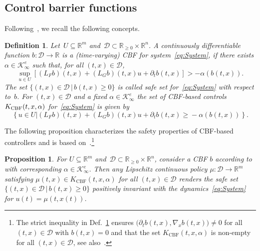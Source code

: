\documentclass[journal,twoside,web]{ieeeconf}
\newcommand{\R}{\mathbb{R}}
\newtheorem{prop}{Proposition}
\newtheorem{defn}{Definition}
\begin{document}
\subsection{Control barrier functions}

Following~\cite[Def.~2]{ames2019control}, we recall the following concepts.
\begin{defn} \label{Def:TVCBF}
   Let~$U \subseteq \R^m$ and~$\mathcal{D} \subset \R_{\ge 0} \times \R^n$.
     A continuously differentiable function $b: \mathcal{D} \to \R$ is a \textit{(time-varying) CBF} for system~\eqref{eq:System}, if there exists 
     $\alpha \in \mathcal{K}_\infty^e$ such that, for all $(t,x) \in \mathcal{D}$,
    \begin{equation*}
        \sup_{u \in U} \left[ (L_F b)(t,x) \!+\! (L_G b)(t,x) u \!+\! \partial_t b(t,x) \right] > - \alpha(b(t,x)).
    \end{equation*}
    The set 
    $   \{ (t,x)\in\mathcal{D} \, | \, b(t,x) \ge 0\} $
    is called \textit{safe set} for~\eqref{eq:System} with respect to~$b$.
    For $(t,x) \in \mathcal{D}$ and a fixed $\alpha \in \mathcal{K}_\infty^e$ the set of \textit{CBF-based controls} $K_{\rm CBF}(t,x,\alpha)$ for~\eqref{eq:System} is given by 
\begin{equation*} 
    \left\{ u\! \in\! U |  (L_F b)(t,x) \!+\! (L_G b)(t,x)u \!+\! \partial_t b(t,x)  \!\ge\! - \alpha ( b(t,x)) \right\}\!.
\end{equation*}%
\end{defn}
The following proposition characterizes the safety properties of CBF-based controllers and is based on~\cite[Thm.~2]{ames2019control}.\footnote{%
The strict inequality in Def.~\ref{Def:TVCBF} ensures $\big(\partial_t b(t,x), \nabla_x b(t,x)\big)\neq 0$ for all $(t,x)\in\mathcal{D}$ with $b(t,x)=0$ and that the set $K_{\mathrm{CBF}}(t,x,\alpha)$ is non-empty for all $(t,x)\in\mathcal{D}$, see also~\cite[Rem.~1]{cohen2024safety}.}
\begin{prop}
\label{prop:CBF}
For $U \subseteq \R^m$ and~$\mathcal{D} \subset \R_{\ge 0} \times \R^n$, consider a CBF $b$ according to  with corresponding  ${\alpha \in \mathcal{K}_\infty^e}$. 
Then any Lipschitz continuous policy $\mu:\mathcal{D}\to\R^m$ satisfying $\mu(t,x)\in K_{\mathrm{CBF}}(t,x,\alpha)$ for all $(t,x)\in \mathcal{D}$ renders the safe set $\{ (t,x)\in\mathcal{D} \, | \, b(t,x) \ge 0\}$ positively invariant with the dynamics~\eqref{eq:System} for $u(t) = \mu(t,x(t))$. 
\end{prop}
\end{document}
